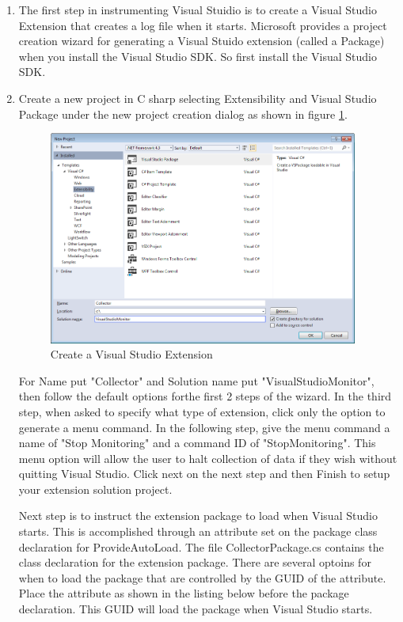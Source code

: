 \begin{enumerate}
\item
The first step in instrumenting Visual Stuidio is to create a Visual Studio Extension that creates a log file when it starts.   Microsoft provides a project creation wizard for generating a Visual Stuido extension (called a Package) when you install the Visual Studio SDK.  So first install the Visual Studio SDK.  

\item Create a new project in C sharp selecting Extensibility and Visual Studio Package under the new project creation dialog as shown in figure \ref{fig:ProjectCreation}.  
\begin{figure}
	\centering
	\includegraphics[width=4in]{Graphics/CreateVSIXExtension.png}
	\caption{Create a Visual Studio Extension}
	\label{fig:ProjectCreation}
\end{figure}

For Name put "Collector" and Solution name put "VisualStudioMonitor", then follow the default options forthe first 2 steps of the wizard.  In the third step, when asked to specify what type of extension, click only the option to generate a menu command.  In the following step, give the menu command a name of "Stop Monitoring" and a command ID of "StopMonitoring".  This menu option will allow the user to halt collection of data if they wish without quitting Visual Studio.  Click next on the next step and then Finish to setup your extension solution project.

Next step is to instruct the extension package to load when Visual Studio starts. This is accomplished through an attribute set on the package class declaration for ProvideAutoLoad.  The file CollectorPackage.cs contains the class declaration for the extension package.   There are several optoins for when to load the package that are controlled by the GUID of the attribute.  Place the attribute as shown in the listing below before the package declaration.  This GUID will load the package when Visual Studio starts.


\end{enumerate}
